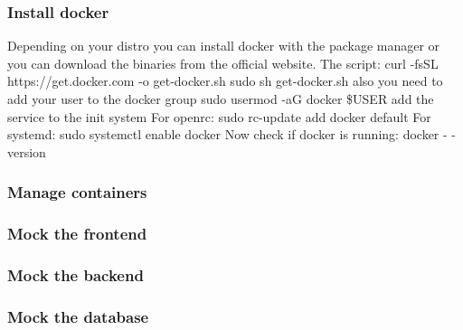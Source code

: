 \documentclass{beamer}
\begin{document}
\begin{frame}
    \frametitle{Install docker}
    \small
    Depending on your distro you can install docker with the package manager
    or you can download the binaries from the official website.
    \newline
    The script:
        curl -fsSL https://get.docker.com -o get-docker.sh
        sudo sh get-docker.sh
    \newline
    also you need to add your user to the docker group
    \newline
    sudo usermod -aG docker \$USER
    \newline
    add the service to the init system
    \newline For openrc: sudo rc-update add docker default
    \newline For systemd: sudo systemctl enable docker
    \newline Now check if docker is running:
    \newline docker - -version
\end{frame}

\begin{frame}
    \frametitle{Manage containers}
\end{frame}
\begin{frame}
    \frametitle{Mock the frontend}
\end{frame}
\begin{frame}
    \frametitle{Mock the backend}
\end{frame}
\begin{frame}
    \frametitle{Mock the database}
\end{frame}
\end{document}
